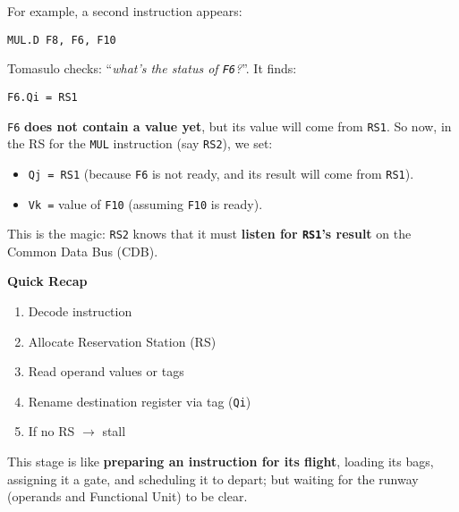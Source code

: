 \begin{examplebox}
    For example, a second instruction appears:
    \begin{lstlisting}[language=unknown]
MUL.D F8, F6, F10\end{lstlisting}
    Tomasulo checks: ``\emph{what's the status of \texttt{F6}?}''. It finds:
    \begin{center}
        \texttt{F6.Qi = RS1}
    \end{center}

    \texttt{F6} \textbf{does not contain a value yet}, but its value will come from \texttt{RS1}. So now, in the RS for the \texttt{MUL} instruction (say \texttt{RS2}), we set:
    \begin{itemize}
        \item \texttt{Qj = RS1} (because \texttt{F6} is not ready, and its result will come from \texttt{RS1}).
        \item \texttt{Vk =} value of \texttt{F10} (assuming \texttt{F10} is ready).
    \end{itemize}
    This is the magic: \texttt{RS2} knows that it must \textbf{listen for \texttt{RS1}'s result} on the Common Data Bus (CDB).
\end{examplebox}

\newpage

\begin{flushleft}
    \textcolor{Green3}{ \textbf{Quick Recap}}
\end{flushleft}
\begin{enumerate}
    \item Decode instruction
    \item Allocate Reservation Station (RS)
    \item Read operand values or tags
    \item Rename destination register via tag (\texttt{Qi})
    \item If no RS $\rightarrow$ stall
\end{enumerate}
This stage is like \textbf{preparing an instruction for its flight}, loading its bags, assigning it a gate, and scheduling it to depart; but waiting for the runway (operands and Functional Unit) to be clear.